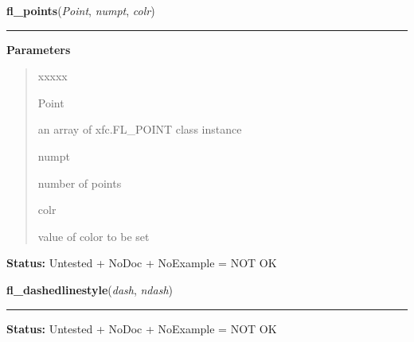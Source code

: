 \hspace{.8\funcindent}\begin{boxedminipage}{\funcwidth}

    \raggedright \textbf{fl\_points}(\textit{Point}, \textit{numpt}, \textit{colr})

    \vspace{-1.5ex}

    \rule{\textwidth}{0.5\fboxrule}
\setlength{\parskip}{2ex}
\setlength{\parskip}{1ex}
      \textbf{Parameters}
      \vspace{-1ex}

      \begin{quote}
        \begin{Ventry}{xxxxx}

          \item[Point]

          an array of xfc.FL\_POINT class instance

          \item[numpt]

          number of points

          \item[colr]

          value of color to be set

        \end{Ventry}

      \end{quote}

\textbf{Status:} Untested + NoDoc + NoExample = NOT OK



    \end{boxedminipage}

    \label{xformslib:library:fl_dashedlinestyle}

    \vspace{0.5ex}

\hspace{.8\funcindent}\begin{boxedminipage}{\funcwidth}

    \raggedright \textbf{fl\_dashedlinestyle}(\textit{dash}, \textit{ndash})

    \vspace{-1.5ex}

    \rule{\textwidth}{0.5\fboxrule}
\setlength{\parskip}{2ex}
\setlength{\parskip}{1ex}
\textbf{Status:} Untested + NoDoc + NoExample = NOT OK



    \end{boxedminipage}

